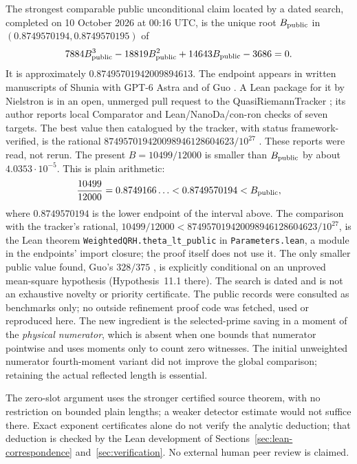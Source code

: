 \documentclass[11pt]{article}
\begin{document}
The strongest comparable public unconditional claim located by a dated
search, completed on 10 October 2026 at 00:16 UTC, is the unique root
$B_{\rm public}$ in $(0.8749570194,0.8749570195)$ of
\[
 7884B_{\rm public}^3-18819B_{\rm public}^2
 +14643B_{\rm public}-3686=0.
\]
It is approximately $0.87495701942009894613$. The endpoint appears in
written manuscripts of Shunia with GPT-6 Astra \cite{shunia} and of Guo
\cite{guo}. A Lean package for it by Nielstron is in an open, unmerged
pull request to the QuasiRiemannTracker \cite{nielstron}; its author
reports local Comparator and Lean/NanoDa/con-ron checks of seven targets.
The best value then catalogued by the tracker, with status
framework-verified, is the rational
$874957019420098946128604623/10^{27}$ \cite{tracker}. These reports were
read, not rerun. The present $B=10499/12000$ is smaller than
$B_{\rm public}$ by about $4.0353\cdot10^{-5}$. This is plain arithmetic:
\[
 \frac{10499}{12000}=0.8749166\ldots<0.8749570194<B_{\rm public},
\]
where $0.8749570194$ is the lower endpoint of the interval above. The
comparison with the tracker's rational,
$10499/12000<874957019420098946128604623/10^{27}$, is the Lean theorem
\mbox{\nolinkurl{WeightedQRH.theta_lt_public}} in
\nolinkurl{Parameters.lean}, a module in the endpoints' import closure;
the proof itself does not use it. The only smaller public value
found, Guo's $328/375$ \cite{guo}, is explicitly conditional on an
unproved mean-square hypothesis (Hypothesis~11.1 there). The search is
dated and is not an exhaustive novelty or priority certificate. The
public records were consulted as benchmarks only; no outside refinement
proof code was fetched, used or reproduced here.
The new ingredient is the selected-prime saving in a moment of the
\emph{physical numerator}, which is absent when one bounds that
numerator pointwise and uses moments only to count zero witnesses.
The initial unweighted numerator fourth-moment variant did not improve
the global comparison; retaining the actual reflected length is essential.

The zero-slot argument uses the stronger
certified source theorem, with no restriction on bounded plain lengths;
a weaker detector estimate would not suffice there. Exact exponent
certificates alone do not verify the analytic deduction; that deduction
is checked by the Lean development of
Sections~\ref{sec:lean-correspondence} and~\ref{sec:verification}.
No external human peer review is claimed.
\end{document}
